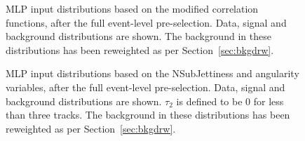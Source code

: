 \documentclass[NOTE, atlasdraft=true, texlive=2017, UKenglish]{\ATLASLATEXPATH atlasdoc}
\begin{document}

\begin{figure}[!htbp]
  \centering
  \caption{MLP input distributions based on the modified correlation functions, after the full event-level pre-selection. Data, signal and background distributions are shown. The background in these distributions has been reweighted as per Section~\ref{sec:bkgdrw}.}
  \label{fig:modcfvars}
\end{figure}

\begin{figure}[!htbp]
  \centering
  \caption{MLP input distributions based on the NSubJettiness and angularity variables, after the full event-level pre-selection. Data, signal and background distributions are shown. $\tau_2$ is defined to be 0 for less than three tracks. The background in these distributions has been reweighted as per Section~\ref{sec:bkgdrw}.}
  \label{fig:angularity2}
\end{figure}
\end{document}
